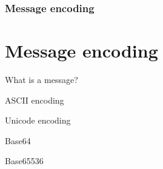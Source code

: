 \section[Section]{Message encoding}
\part{Message encoding}

\begin{frame}{What is a message?}

\end{frame}

\begin{frame}{ASCII encoding}

\end{frame}

\begin{frame}{Unicode encoding}

\end{frame}

\begin{frame}{Base64}

\end{frame}

\begin{frame}{Base65536}

\end{frame}
